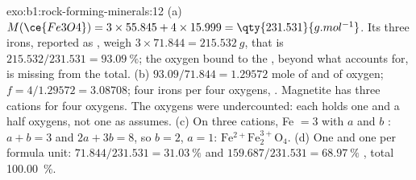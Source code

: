 \begin{solution}{exo:b1:rock-forming-minerals:12}
(a) $M(\ce{Fe3O4}) = 3\times55.845 + 4\times15.999 = \qty{231.531}{g.mol^{-1}}$.
Its three irons, reported as , weigh $3\times71.844 = \qty{215.532}{g}$,
that is $215.532/231.531 = \qty{93.09}{\percent}$; the oxygen bound to the
, beyond what  accounts for, is missing from the total.
(b) $93.09/71.844 = 1.29572$ mole of  and of oxygen; $f =
4/1.29572 = 3.08708$; four irons per four oxygens, . Magnetite has
three cations for four oxygens. The oxygens were undercounted: each
 holds one and a half oxygens, not one as  assumes. (c) On three cations, Fe $= 3$
with $a$  and $b$ : $a + b = 3$ and $2a + 3b = 8$,
so $b = 2$, $a = 1$: $\mathrm{Fe^{2+}Fe^{3+}_2O_4}$. (d) One  and
one  per formula unit: $71.844/231.531 = \qty{31.03}{\percent}$
 and $159.687/231.531 = \qty{68.97}{\percent}$ , total
\qty{100.00}{\percent}.
\end{solution}


